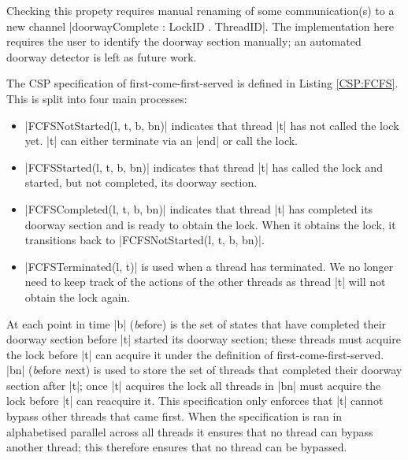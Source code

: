 Checking this propety requires manual renaming of some communication(s) to a new channel |doorwayComplete : LockID . ThreadID|. The implementation here requires the user to identify the doorway section manually; an automated doorway detector is left as future work.

The CSP specification of first-come-first-served is defined in Listing \ref{CSP:FCFS}. This is split into four main processes:
\begin{itemize}
  \item |FCFSNotStarted(l, t, b, bn)| indicates that thread |t| has not called the lock yet. |t| can either terminate via an |end| or call the lock.
  \item |FCFSStarted(l, t, b, bn)| indicates that thread |t| has called the lock and started, but not completed, its doorway section.
  \item |FCFSCompleted(l, t, b, bn)| indicates that thread |t| has completed its doorway section and is ready to obtain the lock. When it obtains the lock, it transitions back to |FCFSNotStarted(l, t, b, bn)|.
  \item |FCFSTerminated(l, t)| is used when a thread has terminated. We no longer need to keep track of the actions of the other threads as thread |t| will not obtain the lock again. 
\end{itemize}

At each point in time |b| (\emph{b}efore) is the set of states that have completed their doorway section before |t| started its doorway section; these threads must acquire the lock before |t| can acquire it under the definition of first-come-first-served. |bn| (\emph{b}efore \emph{n}ext) is used to store the set of threads that completed their doorway section after |t|; once |t| acquires the lock all threads in |bn| must acquire the lock before |t| can reacquire it. This specification only enforces that |t| cannot bypass other threads that came first. When the specification is ran in alphabetised parallel across all threads it ensures that no thread can bypass another thread; this therefore ensures that no thread can be bypassed.

